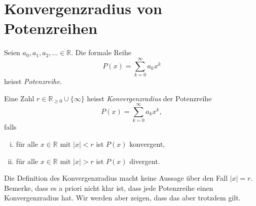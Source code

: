\documentclass[../main.tex]{subfiles}
\begin{document}
\section{Konvergenzradius von Potenzreihen}\label{sec:radius}
Seien $a_0, a_1, a_2, \dots \in \mathbb{R}$.
Die formale Reihe
\[
  P(x) = \sum_{k=0}^{\infty} a_k x^k
\]
heisst \emph{Potenzreihe}.

\begin{definition}
  Eine Zahl $r \in \mathbb{R}_{\geq 0} \cup \{\infty\}$ heisst
  \emph{Konvergenzradius} der Potenzreihe 
  \[
    P(x) = \sum_{k=0}^{\infty} a_k x^k,
  \]
  falls
  \begin{enumerate}[(i)]
    \item für alle $x \in \mathbb{R}$ mit $|x| < r$ ist $P(x)$ konvergent,
    \item für alle $x \in \mathbb{R}$ mit $|x| > r$ ist $P(x)$ divergent.
  \end{enumerate}
\end{definition}

Die Definition des Konvergenzradius macht keine Aussage über den Fall $|x| = r$.
Bemerke, dass es a priori nicht klar ist, dass jede Potenzreihe
einen Konvergenzradius hat. Wir werden aber zeigen, dass das aber trotzdem gilt.
\end{document}
